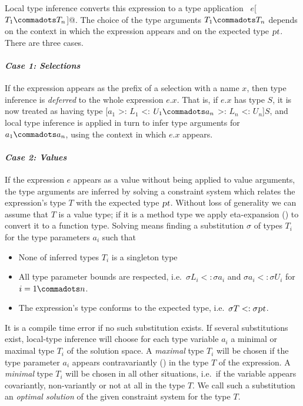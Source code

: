 Local type inference converts this expression to a type
application ~\lstinline@$e$[$T_1 \commadots T_n$]@. The choice of the
type arguments $T_1 \commadots T_n$ depends on the context in which
the expression appears and on the expected type $\mbox{\sl pt}$. 
There are three cases.

\paragraph{\em Case 1: Selections}
If the expression appears as the prefix of a selection with a name
$x$, then type inference is {\em deferred} to the whole expression
$e.x$. That is, if $e.x$ has type $S$, it is now treated as having
type [$a_1$ >: $L_1$ <: $U_1 \commadots a_n$ >: $L_n$ <: $U_n$]$S$,
and local type inference is applied in turn to infer type arguments 
for $a_1 \commadots a_n$, using the context in which $e.x$ appears.

\paragraph{\em Case 2: Values}
If the expression $e$ appears as a value without being applied to
value arguments, the type arguments are inferred by solving a
constraint system which relates the expression's type $T$ with the
expected type $\mbox{\sl pt}$. Without loss of generality we can assume that
$T$ is a value type; if it is a method type we apply eta-expansion
() to convert it to a function type.  Solving
means finding a substitution $\sigma$ of types $T_i$ for the type
parameters $a_i$ such that
\begin{itemize}
\item
None of inferred types $T_i$ is a singleton type 
\item 
All type parameter bounds are respected, i.e.\ 
$\sigma L_i <: \sigma a_i$ and $\sigma a_i <: \sigma U_i$ for $i = 1 \commadots n$.
\item 
The expression's type conforms to the expected type, i.e.\ 
$\sigma T <: \sigma \mbox{\sl pt}$.
\end{itemize}
It is a compile time error if no such substitution exists.  
If several substitutions exist, local-type inference will choose for
each type variable $a_i$ a minimal or maximal type $T_i$ of the
solution space.  A {\em maximal} type $T_i$ will be chosen if the type
parameter $a_i$ appears contravariantly (\sref{sec:variances}) in the
type $T$ of the expression.  A {\em minimal} type $T_i$ will be chosen
in all other situations, i.e.\ if the variable appears covariantly,
non-variantly or not at all in the type $T$. We call such a substitution
an {\em optimal solution} of the given constraint system for the type $T$.

